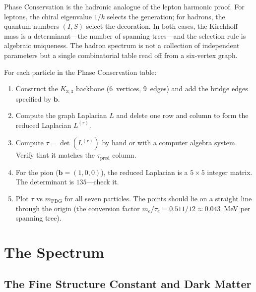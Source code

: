 \documentclass[11pt, a4paper, openany]{book}
\begin{document}
\begin{logicalreading}
Phase Conservation is the hadronic analogue of the lepton harmonic proof.
For leptons, the chiral eigenvalue $1/k$ selects the generation; for
hadrons, the quantum numbers $(I, S)$ select the decoration.  In both
cases, the Kirchhoff mass is a determinant---the number of spanning
trees---and the selection rule is algebraic uniqueness.  The hadron
spectrum is not a collection of independent parameters but a single
combinatorial table read off from a six-vertex graph.
\end{logicalreading}

\begin{simulation}
For each particle in the Phase Conservation table:
\begin{enumerate}
\item Construct the $K_{3,3}$ backbone (6~vertices, 9~edges) and add
  the bridge edges specified by $\mathbf{b}$.
\item Compute the graph Laplacian $L$ and delete one row and column
  to form the reduced Laplacian $L^{(r)}$.
\item Compute $\tau = \det(L^{(r)})$ by hand or with a computer
  algebra system.  Verify that it matches the $\tau_{\mathrm{pred}}$
  column.
\item For the pion ($\mathbf{b} = (1,0,0)$), the reduced Laplacian is
  a $5 \times 5$ integer matrix.  The determinant is $135$---check it.
\item Plot $\tau$ vs $m_{\mathrm{PDG}}$ for all seven particles.  The
  points should lie on a straight line through the origin (the
  conversion factor $m_e / \tau_e = 0.511/12 \approx 0.043$~MeV per
  spanning tree).
\end{enumerate}
\end{simulation}


\part{The Spectrum}

\chapter{The Fine Structure Constant and Dark Matter}\label{ch:alpha}
\end{document}
